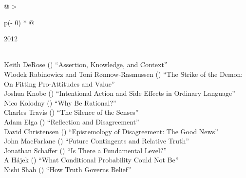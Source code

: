 \documentclass[
  10pt,
  letterpaper,
  DIV=11,
  numbers=noendperiod,
  twoside]{scrartcl}
\begin{document}
\begin{longtable}[]{@{}
  >{\raggedright\arraybackslash}p{(\columnwidth - 0\tabcolsep) * }@{}}

\caption{\label{tbl-top-ten-2003}Most cited articles published less than
ten years ago as of 2012.}

\tabularnewline

\toprule\noalign{}
\begin{minipage}[b]{\linewidth}\raggedright
2012
\end{minipage} \\
\midrule\noalign{}
\endhead
\bottomrule\noalign{}
\endlastfoot
Keith DeRose
()
``Assertion, Knowledge, and Context'' \\
Wlodek Rabinowicz and Toni Rønnow‐Rasmussen
()
``The Strike of the Demon: On Fitting Pro-Attitudes and Value'' \\
Joshua Knobe
()
``Intentional Action and Side Effects in Ordinary Language'' \\
Nico Kolodny
()
``Why Be Rational?'' \\
Charles Travis
()
``The Silence of the Senses'' \\
Adam Elga
()
``Reflection and Disagreement'' \\
David Christensen
()
``Epistemology of Disagreement: The Good News'' \\
John MacFarlane
()
``Future Contingents and Relative Truth'' \\
Jonathan Schaffer
()
``Is There a Fundamental Level?'' \\
A Hájek
()
``What Conditional Probability Could Not Be'' \\
Nishi Shah
()
``How Truth Governs Belief'' \\

\end{longtable}
\end{document}
